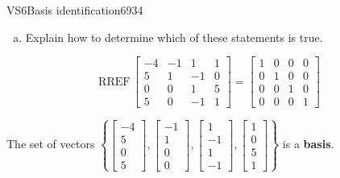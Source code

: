 \begin{exercise}{VS6}{Basis identification}{6934}
\begin{exerciseStatement}
\begin{enumerate}[(a)]
\begin{itemize}
 
\end{itemize}

     
\item  

 Explain how to determine which of these statements is true. 

 
\end{enumerate}

     \end{exerciseStatement}
 \begin{exerciseAnswer} 

 \[
\mathrm{RREF}\, \left[\begin{array}{cccc}
-4 & -1 & 1 & 1 \\
5 & 1 & -1 & 0 \\
0 & 0 & 1 & 5 \\
5 & 0 & -1 & 1
\end{array}\right] = \left[\begin{array}{cccc}
1 & 0 & 0 & 0 \\
0 & 1 & 0 & 0 \\
0 & 0 & 1 & 0 \\
0 & 0 & 0 & 1
\end{array}\right]
            \] 

 

 The set of vectors \(\left\{ \left[\begin{array}{c}
-4 \\
5 \\
0 \\
5
\end{array}\right] , \left[\begin{array}{c}
-1 \\
1 \\
0 \\
0
\end{array}\right] , \left[\begin{array}{c}
1 \\
-1 \\
1 \\
-1
\end{array}\right] , \left[\begin{array}{c}
1 \\
0 \\
5 \\
1
\end{array}\right] \right\}\) is a \textbf{basis}. 

 \end{exerciseAnswer}
 \end{exercise}


